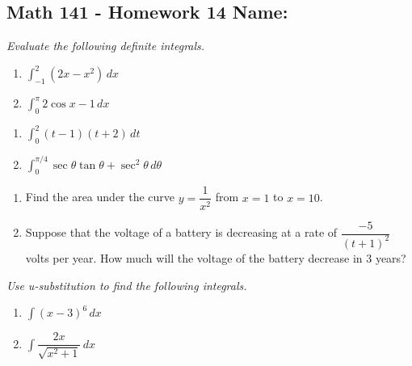 \documentclass[11pt]{article}
\newcommand{\ds}{\displaystyle}
\begin{document}
\pagestyle{empty}
\subsection*{Math 141 - Homework 14 \hfill Name: \underline{\hspace*{2in}}}


\textit{Evaluate the following definite integrals.}
\begin{multicols}{2}
\begin{enumerate}
\item $\ds \int_{-1}^2 (2x - x^2) \, dx$
\item $\ds \int_0^\pi 2 \cos x - 1 \, dx$
\setcounter{enumCount}{\theenumi}
\end{enumerate}
\end{multicols}
\vfill


\begin{multicols}{2}
\begin{enumerate}
\setcounter{enumi}{\theenumCount}
\item $\ds \int_0^2 (t-1)(t+2) \, dt$
\item $\ds \int_0^{\pi/4} \sec \theta \tan \theta + \sec^2 \theta \, d \theta$
\setcounter{enumCount}{\theenumi}
\end{enumerate}
\end{multicols}
\vfill






\begin{enumerate}
\setcounter{enumi}{\theenumCount}
\item Find the area under the curve $y = \dfrac{1}{x^2}$ from $x = 1$ to $x = 10$. 
\vfill

\item Suppose that the voltage of a battery is decreasing at a rate of $\dfrac{-5}{(t+1)^2}$ volts per year.  How much will the voltage of the battery decrease in 3 years?  
\vfill
\setcounter{enumCount}{\theenumi}
\end{enumerate}


\newpage


\noindent
\textit{Use u-substitution to find the following integrals.}

\begin{multicols}{2}
\begin{enumerate}
\setcounter{enumi}{\theenumCount}
\item $\ds \int (x-3)^6 \, dx$
\item $\ds \int \dfrac{2x}{\sqrt{x^2 + 1}} \, dx$
\setcounter{enumCount}{\theenumi}
\end{enumerate}
\end{multicols}
\vfill
\end{document}
